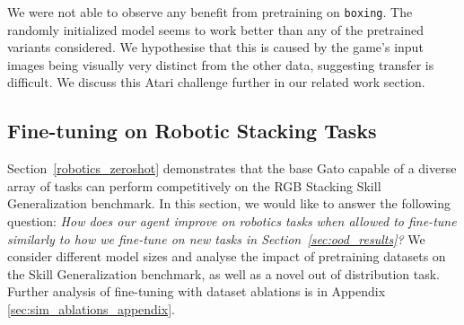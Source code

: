 \documentclass[10pt]{article} \usepackage[accepted]{tmlr}
\newcommand{\model}{{Gato}}
\begin{document}
We were not able to observe any benefit from pretraining on \texttt{boxing}.
The randomly initialized model seems to work better than any of the pretrained variants considered.
We hypothesise that this is caused by the game's input images being visually very distinct from the other data, suggesting transfer is difficult.
We discuss this Atari challenge further in our related work section.
\vskip 0.4cm
\subsection{Fine-tuning on Robotic Stacking Tasks}
\label{sec:skill_gen}
\vskip 0.2cm
Section~\ref{robotics_zeroshot} demonstrates that the base \model{} capable of a diverse array of tasks can perform competitively on the RGB Stacking Skill Generalization benchmark.
In this section, we would like to answer the following question:
\emph{How does our agent improve on robotics tasks when allowed to fine-tune similarly to how we fine-tune on new tasks in Section~\ref{sec:ood_results}?}
We consider different model sizes and analyse the impact of pretraining datasets on the Skill Generalization benchmark, as well as a novel out of distribution task. Further analysis of fine-tuning with dataset ablations is in Appendix \ref{sec:sim_ablations_appendix}.
\end{document}
